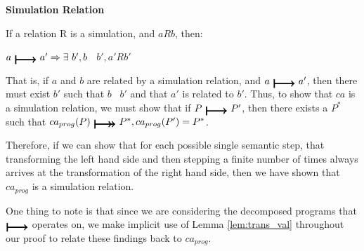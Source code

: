 \begin{definition} \textbf{Simulation Relation}

If a relation R is a simulation, and $aRb$, then:

$a\ \step\ a' => \exists\ b', b$ \trstep\ $b', a'Rb'$
\end{definition}

That is, if $a$ and $b$ are related by a simulation relation, and $a\ \step\ a'$, then there must exist $b'$ such that $b$ \trstep\ $b'$ and that $a'$ is related to $b'$. Thus, to show that $ca$ is a simulation relation, we must show that if $P\ \step\ P'$, then there exists a ${P^{*}}$ such that $ca_{prog}(P)\ \trstep\ {P^{*}}, ca_{prog}(P') = {P^{*}}$.

Therefore, if we can show that for each possible single semantic step, that transforming the left hand side and then stepping a finite number of times always arrives at the transformation of the right hand side, then we have shown that $ca_{prog}$ is a simulation relation.

One thing to note is that since we are considering the decomposed programs that $\step$ operates on, we make implicit use of Lemma \ref{lem:trans_val} throughout our proof to relate these findings back to $ca_{prog}$.


